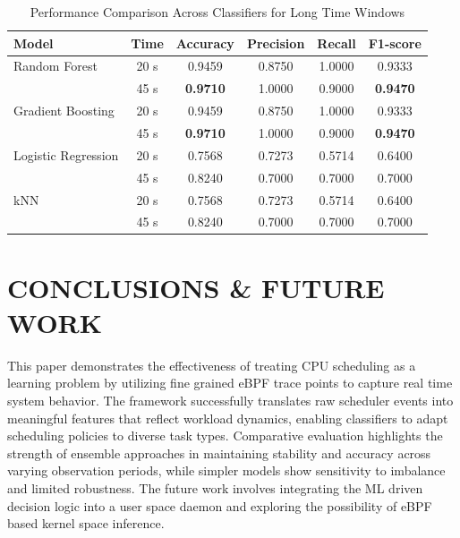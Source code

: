 \documentclass{llncs}
\begin{document}
\begin{table}[t]
\centering
\caption{Performance Comparison Across Classifiers for Long Time Windows}
\label{tab:long_window_comparison}
\setlength{\tabcolsep}{5pt}
\renewcommand{\arraystretch}{1.15}
\begin{tabular}{lccccc}
\hline
\textbf{Model} & \textbf{Time} & \textbf{Accuracy} & \textbf{Precision} & \textbf{Recall} & \textbf{F1-score} \\
\hline
Random Forest        & 20 s & 0.9459 & 0.8750 & 1.0000 & 0.9333 \\
                     & 45 s & \textbf{0.9710} & 1.0000 & 0.9000 & \textbf{0.9470} \\
Gradient Boosting    & 20 s & 0.9459 & 0.8750 & 1.0000 & 0.9333 \\
                     & 45 s & \textbf{0.9710} & 1.0000 & 0.9000 & \textbf{0.9470} \\
Logistic Regression  & 20 s & 0.7568 & 0.7273 & 0.5714 & 0.6400 \\
                     & 45 s & 0.8240 & 0.7000 & 0.7000 & 0.7000 \\
kNN                  & 20 s & 0.7568 & 0.7273 & 0.5714 & 0.6400 \\
                     & 45 s & 0.8240 & 0.7000 & 0.7000 & 0.7000 \\
\hline
\end{tabular}
\end{table}




\section{CONCLUSIONS \& FUTURE WORK}
This paper demonstrates the effectiveness of treating CPU scheduling as a learning problem by utilizing fine grained eBPF trace points to capture real time system behavior. The framework successfully translates raw scheduler events into meaningful features that reflect workload dynamics, enabling classifiers to adapt scheduling policies to diverse task types. Comparative evaluation highlights the strength of ensemble approaches in maintaining stability and accuracy across varying observation periods, while simpler models show sensitivity to imbalance and limited robustness. The future work involves integrating the ML driven decision logic into a user space daemon and exploring the possibility of eBPF based kernel space inference.






  
\end{document}
